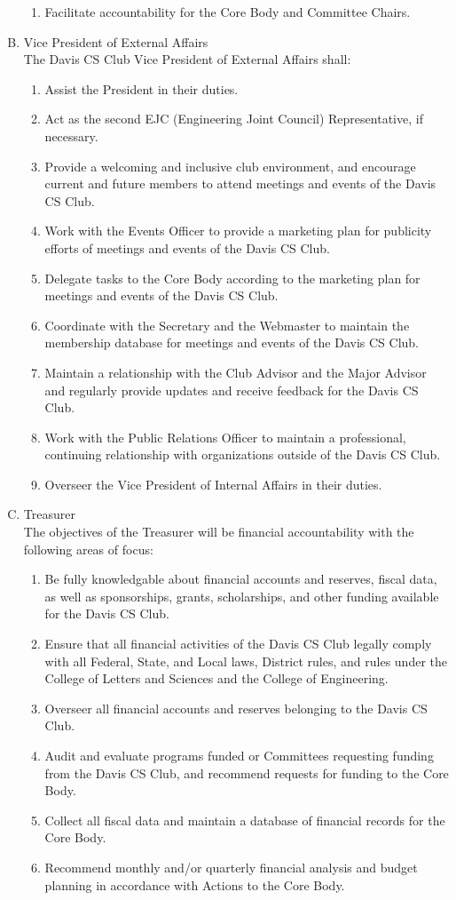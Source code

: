\documentclass{article}
\newenvironment{li}{
\begin{enumerate}
  \setlength{\itemsep}{1pt}
  \setlength{\parskip}{0pt}
  \setlength{\parsep}{0pt}
}{\end{enumerate}}
\begin{document}
\begin{enumerate}[A.]
\begin{li}
	\item Facilitate accountability for the Core Body and Committee Chairs.
	\end{li}
\item Vice President of External Affairs\\
	The Davis CS Club Vice President of External Affairs shall:
	\begin{li}
	\item Assist the President in their duties.
	\item Act as the second EJC (Engineering Joint Council) Representative, if necessary.
	\item Provide a welcoming and inclusive club environment, and encourage current and future members to attend meetings and events of the Davis CS Club.
	\item Work with the Events Officer to provide a marketing plan for publicity efforts of meetings and events of the Davis CS Club.
	\item Delegate tasks to the Core Body according to the marketing plan for meetings and events of the Davis CS Club.
	\item Coordinate with the Secretary and the Webmaster to maintain the membership database for meetings and events of the Davis CS Club.
	\item Maintain a relationship with the Club Advisor and the Major Advisor and regularly provide updates and receive feedback for the Davis CS Club.
	\item Work with the Public Relations Officer to maintain a professional, continuing relationship with organizations outside of the Davis CS Club.
	\item Overseer the Vice President of Internal Affairs in their duties.
	\end{li}
\item Treasurer\\
	The objectives of the Treasurer will be financial accountability with the following areas of focus:
	\begin{li}
	\item Be fully knowledgable about financial accounts and reserves, fiscal data, as well as sponsorships, grants, scholarships, and other funding available for the Davis CS Club.
	\item Ensure that all financial activities of the Davis CS Club legally comply with all Federal, State, and Local laws, District rules, and rules under the College of Letters and Sciences and the College of Engineering.
	\item Overseer all financial accounts and reserves belonging to the Davis CS Club.
	\item Audit and evaluate programs funded or Committees requesting funding from the Davis CS Club, and recommend requests for funding to the Core Body.
	\item Collect all fiscal data and maintain a database of financial records for the Core Body.
	\item Recommend monthly and/or quarterly financial analysis and budget planning in accordance with Actions to the Core Body.
	\end{li}


\end{enumerate}
\end{document}
